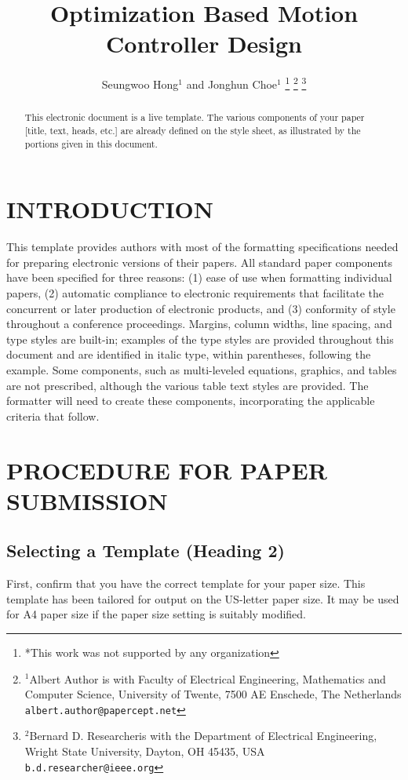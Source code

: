 \documentclass[letterpaper, 10 pt, conference]{ieeeconf}  %
\title{\LARGE \bf
Optimization Based Motion Controller Design
}
\author{Seungwoo Hong$^{1}$ and Jonghun Choe$^{1}$%
\thanks{*This work was not supported by any organization}%
\thanks{$^{1}$Albert Author is with Faculty of Electrical Engineering, Mathematics and Computer Science,
        University of Twente, 7500 AE Enschede, The Netherlands
        {\tt\small albert.author@papercept.net}}%
\thanks{$^{2}$Bernard D. Researcheris with the Department of Electrical Engineering, Wright State University,
        Dayton, OH 45435, USA
        {\tt\small b.d.researcher@ieee.org}}%
}
\begin{document}
\maketitle
\thispagestyle{empty}
\pagestyle{empty}


\begin{abstract}

This electronic document is a  live  template. The various components of your paper [title, text, heads, etc.] are already defined on the style sheet, as illustrated by the portions given in this document.

\end{abstract}


\section{INTRODUCTION}

This template provides authors with most of the formatting specifications needed for preparing electronic versions of their papers. All standard paper components have been specified for three reasons: (1) ease of use when formatting individual papers, (2) automatic compliance to electronic requirements that facilitate the concurrent or later production of electronic products, and (3) conformity of style throughout a conference proceedings. Margins, column widths, line spacing, and type styles are built-in; examples of the type styles are provided throughout this document and are identified in italic type, within parentheses, following the example. Some components, such as multi-leveled equations, graphics, and tables are not prescribed, although the various table text styles are provided. The formatter will need to create these components, incorporating the applicable criteria that follow.

\section{PROCEDURE FOR PAPER SUBMISSION}

\subsection{Selecting a Template (Heading 2)}

First, confirm that you have the correct template for your paper size. This template has been tailored for output on the US-letter paper size. 
It may be used for A4 paper size if the paper size setting is suitably modified.
\end{document}
